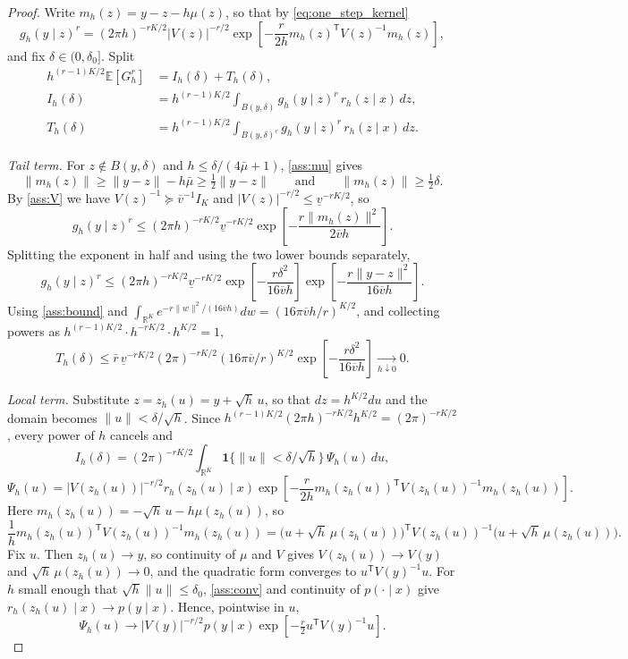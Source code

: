 \documentclass[11pt]{article}
\theoremstyle{definition}
\newcommand{\R}{\mathbb{R}}
\newcommand{\E}{\mathbb{E}}
\begin{document}
\begin{proof}
Write $m_h(z)=y-z-h\mu(z)$, so that by \eqref{eq:one_step_kernel}
\begin{equation}\label{eq:Ghr}
g_h(y\mid z)^r
=(2\pi h)^{-rK/2}|V(z)|^{-r/2}
\exp\!\left[-\frac{r}{2h}m_h(z)^{\mathsf T}V(z)^{-1}m_h(z)\right],
\end{equation}
and fix $\delta\in(0,\delta_0]$. Split
\begin{align*}
h^{(r-1)K/2}\E[G_h^r]
&=I_h(\delta)+T_h(\delta),\\
I_h(\delta)&=h^{(r-1)K/2}\int_{B(y,\delta)}g_h(y\mid z)^r\,r_h(z\mid x)\,dz,\\
T_h(\delta)&=h^{(r-1)K/2}\int_{B(y,\delta)^c}g_h(y\mid z)^r\,r_h(z\mid x)\,dz .
\end{align*}

\emph{Tail term.} For $z\notin B(y,\delta)$ and $h\le\delta/(4\bar\mu+1)$, \ref{ass:mu} gives
\[
\lVert m_h(z)\rVert\ge\lVert y-z\rVert-h\bar\mu\ge\tfrac12\lVert y-z\rVert
\qquad\text{and}\qquad
\lVert m_h(z)\rVert\ge\tfrac12\delta .
\]
By \ref{ass:V} we have $V(z)^{-1}\succeq\overline v^{-1}I_K$ and $|V(z)|^{-r/2}\le\underline v^{-rK/2}$, so
\[
g_h(y\mid z)^r
\le(2\pi h)^{-rK/2}\underline v^{-rK/2}
\exp\!\left[-\frac{r\lVert m_h(z)\rVert^2}{2\overline vh}\right].
\]
Splitting the exponent in half and using the two lower bounds separately,
\[
g_h(y\mid z)^r
\le(2\pi h)^{-rK/2}\underline v^{-rK/2}
\exp\!\left[-\frac{r\delta^2}{16\overline vh}\right]
\exp\!\left[-\frac{r\lVert y-z\rVert^2}{16\overline vh}\right].
\]
Using \ref{ass:bound} and $\int_{\R^K}e^{-r\lVert w\rVert^2/(16\overline vh)}dw=(16\pi\overline vh/r)^{K/2}$, and collecting powers as $h^{(r-1)K/2}\cdot h^{-rK/2}\cdot h^{K/2}=1$,
\begin{equation}\label{eq:tail_bound}
T_h(\delta)\le
\bar r\,\underline v^{-rK/2}(2\pi)^{-rK/2}(16\pi\overline v/r)^{K/2}
\exp\!\left[-\frac{r\delta^2}{16\overline vh}\right]
\xrightarrow[h\downarrow0]{}0 .
\end{equation}

\emph{Local term.} Substitute $z=z_h(u)=y+\sqrt h\,u$, so that $dz=h^{K/2}du$ and the domain becomes $\lVert u\rVert<\delta/\sqrt h$. Since $h^{(r-1)K/2}(2\pi h)^{-rK/2}h^{K/2}=(2\pi)^{-rK/2}$, every power of $h$ cancels and
\[
I_h(\delta)=(2\pi)^{-rK/2}\int_{\R^K}\mathbf 1\{\lVert u\rVert<\delta/\sqrt h\}\,\Psi_h(u)\,du,
\]
\[
\Psi_h(u)=|V(z_h(u))|^{-r/2}r_h(z_h(u)\mid x)
\exp\!\left[-\frac{r}{2h}m_h(z_h(u))^{\mathsf T}V(z_h(u))^{-1}m_h(z_h(u))\right].
\]
Here $m_h(z_h(u))=-\sqrt h\,u-h\mu(z_h(u))$, so
\[
\frac1hm_h(z_h(u))^{\mathsf T}V(z_h(u))^{-1}m_h(z_h(u))
=\bigl(u+\sqrt h\,\mu(z_h(u))\bigr)^{\mathsf T}V(z_h(u))^{-1}\bigl(u+\sqrt h\,\mu(z_h(u))\bigr).
\]
Fix $u$. Then $z_h(u)\to y$, so continuity of $\mu$ and $V$ gives $V(z_h(u))\to V(y)$ and $\sqrt h\,\mu(z_h(u))\to0$, and the quadratic form converges to $u^{\mathsf T}V(y)^{-1}u$. For $h$ small enough that $\sqrt h\lVert u\rVert\le\delta_0$, \ref{ass:conv} and continuity of $p(\cdot\mid x)$ give $r_h(z_h(u)\mid x)\to p(y\mid x)$. Hence, pointwise in $u$,
\[
\Psi_h(u)\longrightarrow|V(y)|^{-r/2}p(y\mid x)\exp\!\left[-\tfrac r2u^{\mathsf T}V(y)^{-1}u\right].
\]


\end{proof}
\end{document}
